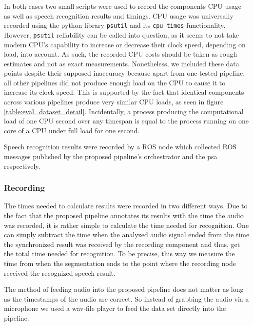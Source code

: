 In both cases two small scripts were used to record the components CPU usage as well as speech recognition results and timings.
CPU usage was universally recorded using the python library \texttt{psutil} \cite{psutil} and its \texttt{cpu\_times} functionality.
However, \texttt{psutil} reliability can be called into question, as it seems to not take modern CPU's capability to increase or decrease their clock speed, depending on load, into account.
As such, the recorded CPU costs should be taken as rough estimates and not as exact measurements.
Nonetheless, we included these data points despite their supposed inaccuracy because apart from one tested pipeline, all other pipelines did not produce enough load on the CPU to cause it to increase its clock speed.
This is supported by the fact that identical components across various pipelines produce very similar CPU loads, as seen in figure 
\ref{table:eval_dataset_detail}.
Incidentally, a process producing the computational load of one CPU second over any timespan is equal to the process running on one core of a CPU under full load for one second.

Speech recognition results were recorded by a ROS node which collected ROS messages published by the proposed pipeline's orchestrator and the \gls{psa} respectively.

\subsubsection{Recording}

The times needed to calculate results were recorded in two different ways.
Due to the fact that the proposed pipeline annotates its results with the time the audio was recorded, it is rather simple to calculate the time needed for recognition.
One can simply subtract the time when the analyzed audio signal ended from the time the synchronized result was received by the recording component and thus, get the total time needed for recognition.
To be precise, this way we measure the time from when the segmentation ends to the point where the recording node received the recognized speech result.

The method of feeding audio into the proposed pipeline does not matter as long as the timestamps of the audio are correct.
So instead of grabbing the audio via a microphone we used a wav-file player to feed the data set directly into the pipeline.

